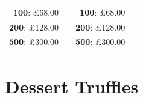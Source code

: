 \documentclass[11pt, english]{article}
\begin{document}
\begin{table}[h]
\begin{center}
\begin{tabular}{r|p{4cm}r|p{4cm}}
		\textbf{100}: \pounds68.00 & & \textbf{100}: \pounds68.00 & \\
		\textbf{200}: \pounds128.00 & & \textbf{200}: \pounds128.00 & \\
		\textbf{500}: \pounds300.00 & & \textbf{500}: \pounds300.00 & \\
	\end{tabular}
	\end{center}
	\end{table}

\newpage

\section{Dessert Truffles}
\end{document}
